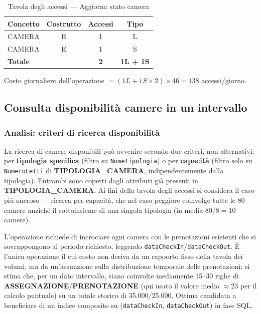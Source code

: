\documentclass[a4paper,12pt]{report}
\begin{document}
\begin{table}[H]
    \centering
    \begin{tabular}{|l|c|c|c|}
        \hline
        \rowcolor{headerblue}
        \textbf{Concetto} & \textbf{Costrutto} & \textbf{Accessi} & \textbf{Tipo}    \\
        \hline
        CAMERA            & E                  & 1                & L                \\
        CAMERA            & E                  & 1                & S                \\
        \hline
        \rowcolor{gray!25}
        \textbf{Totale}   &                    & \textbf{2}       & \textbf{1L + 1S} \\
        \hline
    \end{tabular}
    \caption{Tavola degli accessi --- Aggiorna stato camera}
\end{table}

Costo giornaliero dell'operazione $= (1L + 1S{\times}2) \times 46 = 138$
accessi/giorno.

\newpage

\subsection{Consulta disponibilità camere in un intervallo}
\label{sec:ConsultaDisponibilita}

\subsubsection*{Analisi: criteri di ricerca disponibilità}
La ricerca di camere disponibili può avvenire secondo due criteri, non
alternativi: per \textbf{tipologia specifica} (filtro su
\texttt{NomeTipologia}) o per \textbf{capacità} (filtro solo su
\texttt{NumeroLetti} di \textbf{TIPOLOGIA\_CAMERA}, indipendentemente
dalla tipologia). Entrambi sono coperti dagli attributi già presenti in
\textbf{TIPOLOGIA\_CAMERA}. Ai fini della tavola degli accessi si
considera il caso più oneroso --- ricerca per capacità, che nel caso
peggiore coinvolge tutte le 80 camere anziché il sottoinsieme di una
singola tipologia (in media $80/8=10$ camere).

L'operazione richiede di incrociare ogni camera con le prenotazioni
esistenti che si sovrappongono al periodo richiesto, leggendo
\texttt{dataCheckIn}/\texttt{dataCheckOut}. È l'unica operazione il cui
costo non deriva da un rapporto fisso della tavola dei volumi, ma da
un'assunzione sulla distribuzione temporale delle prenotazioni: si stima
che, per un dato intervallo, siano coinvolte mediamente 15--30 righe di
\textbf{ASSEGNAZIONE}/\textbf{PRENOTAZIONE} (qui usato il valore medio
$\approx$23 per il calcolo puntuale) su un totale storico di
35.000/25.000. Ottima candidata a beneficiare di un indice composito su
(\texttt{dataCheckIn}, \texttt{dataCheckOut}) in fase SQL.
\end{document}
